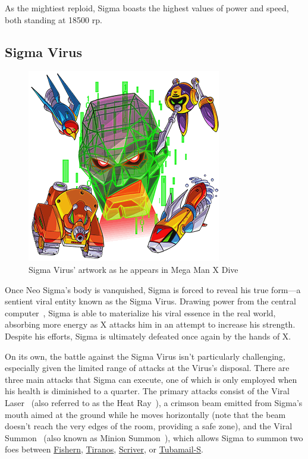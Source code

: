 As the mightiest reploid, Sigma boasts the highest values of power and speed, both standing at 18500 rp.

\subsection{Sigma Virus}\label{boss:Sigma_virus}
\begin{figure}[htp]
	\centering
	\includegraphics[height=\portraitsize]{figures/X2/Hunter_stages/Sigma_Virus.png}
	\caption{Sigma Virus' artwork as he appears in Mega Man X Dive}
\end{figure}

Once Neo Sigma's body is vanquished, Sigma is forced to reveal his true form—a sentient viral entity known as the Sigma Virus. Drawing power from the central computer~\cite{wayback:X2_resources}, Sigma is able to materialize his viral essence in the real world, absorbing more energy as X attacks him in an attempt to increase his strength. Despite his efforts, Sigma is ultimately defeated once again by the hands of X.


On its own, the battle against the Sigma Virus isn't particularly challenging, especially given the limited range of attacks at the Virus's disposal. There are three main attacks that Sigma can execute, one of which is only employed when his health is diminished to a quarter. The primary attacks consist of the Viral Laser~\cite{book:MH_field_guide} (also referred to as the Heat Ray~\cite{book:Compendium}), a crimson beam emitted from Sigma's mouth aimed at the ground while he moves horizontally (note that the beam doesn't reach the very edges of the room, providing a safe zone), and the Viral Summon~\cite{book:MH_field_guide} (also known as Minion Summon~\cite{book:Compendium}), which allows Sigma to summon two foes between \hyperlink{enem:Fishern}{Fishern}, \hyperlink{enem:Tiranos}{Tiranos}, \hyperlink{enem:Scriver}{Scriver}, or \hyperlink{enem:Tubamail-S}{Tubamail-S}.

